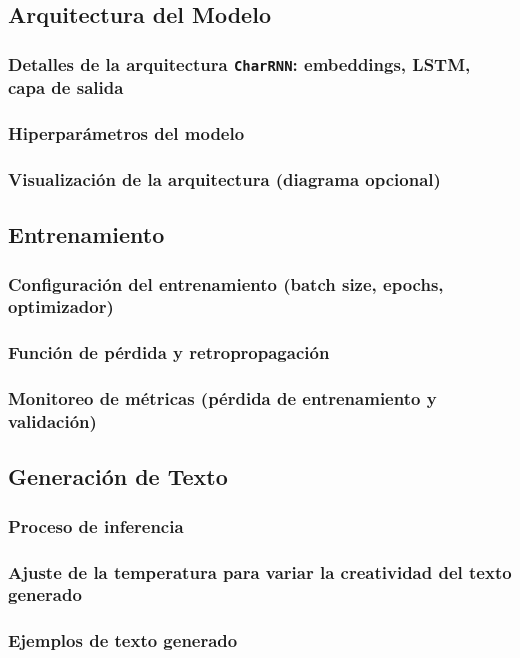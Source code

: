 \documentclass{article}
\begin{document}
\subsection{Arquitectura del Modelo}
\subsubsection{Detalles de la arquitectura \texttt{CharRNN}: embeddings, LSTM, capa de salida}
\subsubsection{Hiperparámetros del modelo}
\subsubsection{Visualización de la arquitectura (diagrama opcional)}

\subsection{Entrenamiento}
\subsubsection{Configuración del entrenamiento (batch size, epochs, optimizador)}
\subsubsection{Función de pérdida y retropropagación}
\subsubsection{Monitoreo de métricas (pérdida de entrenamiento y validación)}

\subsection{Generación de Texto}
\subsubsection{Proceso de inferencia}
\subsubsection{Ajuste de la temperatura para variar la creatividad del texto generado}
\subsubsection{Ejemplos de texto generado}
\end{document}
